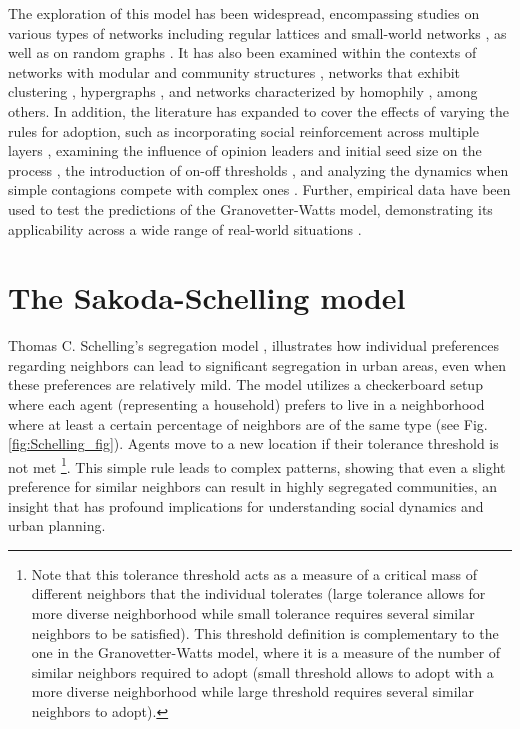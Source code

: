 The exploration of this model has been widespread, encompassing studies on various types of networks including regular lattices and small-world networks \cite{centola-2007}, as well as on random graphs \cite{gleeson-2007}. It has also been examined within the contexts of networks with modular and community structures \cite{gleeson-2008}, networks that exhibit clustering \cite{hackett-2011,hackett-2013}, hypergraphs \cite{de-arruda-2020}, and networks characterized by homophily \cite{diaz-diaz-2022}, among others. In addition, the literature has expanded to cover the effects of varying the rules for adoption, such as incorporating social reinforcement across multiple layers \cite{chen-2018}, examining the influence of opinion leaders and initial seed size on the process \cite{liu-2018, singh-2013}, the introduction of on-off thresholds \cite{dodds-2013}, and analyzing the dynamics when simple contagions compete with complex ones \cite{czaplicka-2016, min-2018, diaz-diaz-2022}. Further, empirical data have been used to test the predictions of the Granovetter-Watts model, demonstrating its applicability across a wide range of real-world situations \cite{centola-2010, karimi-2013, karsai-2014, rosenthal-2015, karsai-2016, mnsted-2017, unicomb-2018, guilbeault-2021}.

\section{\label{sec:The Sakoda-Schelling model} The Sakoda-Schelling model}

Thomas C. Schelling's segregation model \cite{schelling-1969}, illustrates how individual preferences regarding neighbors can lead to significant segregation in urban areas, even when these preferences are relatively mild. The model utilizes a checkerboard setup where each agent (representing a household) prefers to live in a neighborhood where at least a certain percentage of neighbors are of the same type (see Fig. \ref{fig:Schelling_fig}). Agents move to a new location if their tolerance threshold is not met \footnote{Note that this  tolerance threshold acts as a measure of a critical mass of different neighbors that the individual tolerates (large tolerance allows for more diverse neighborhood while small tolerance requires several similar neighbors to be satisfied). This threshold definition is complementary to the one in the Granovetter-Watts model, where it is a measure of the number of similar neighbors required to adopt (small threshold allows to adopt with a more diverse neighborhood while large threshold requires several similar neighbors to adopt).}. This simple rule leads to complex patterns, showing that even a slight preference for similar neighbors can result in highly segregated communities, an insight that has profound implications for understanding social dynamics and urban planning. 

